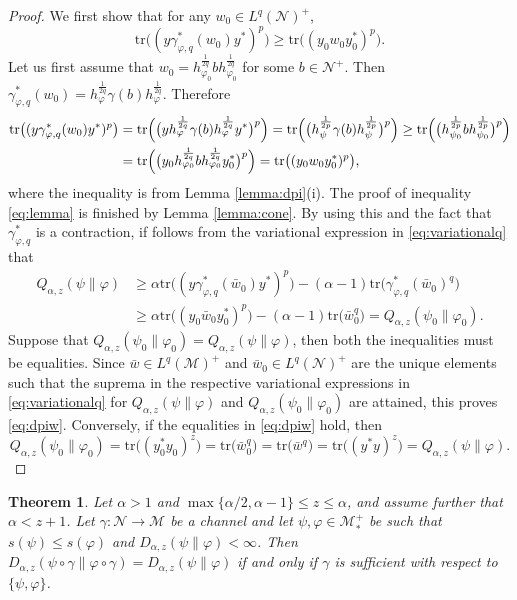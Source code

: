 \documentclass[12pt]{article}
\newtheorem{theorem}{Theorem}[section]
\theoremstyle{definition}
\theoremstyle{remark}
\numberwithin{equation}{section}
\def\Me{\mathcal M}
\def\Ne{\mathcal N}
\def\Tr{\mathrm{tr}}
\def\ffi{\varphi}
\begin{document}
\begin{proof} We first show that  for any $w_0\in L^q(\Ne)^+$,
\begin{equation}\label{eq:lemma}
\Tr\bigl((y\gamma^*_{\ffi,q}(w_0)y^*)^p\bigr)\ge
\Tr\bigl((y_0w_0y_0^*)^p\bigr).
\end{equation}
Let us first assume that
$w_0=h_{\varphi_0}^{\frac1{2q}}bh_{\varphi_0}^{\frac1{2q}}$ for some $b\in \Ne^+$. Then 
$\gamma^*_{\varphi,q}(w_0)=h_{\varphi}^{\frac1{2q}}\gamma(b)h_{\varphi}^{\frac1{2q}}$.
Therefore
\begin{align*}
\Tr\bigl((y\gamma^*_{\varphi,q}(w_0)y^*)^p\bigr)
&=\Tr\Bigl(\bigl(yh_{\varphi}^{\frac1{2q}}\gamma(b)h_{\varphi}^{\frac1{2q}}y^*\bigr)^p\Bigr)=
\Tr\Bigl(\bigl(h_\psi^{\frac1{2p}}\gamma(b)h_\psi^{\frac1{2p}}\bigr)^p\Bigr)\ge
\Tr\Bigl(\bigl(h_{\psi_0}^{\frac1{2p}}bh_{\psi_0}^{\frac1{2p}}\bigr)^p\Bigr)\\
&=\Tr\Bigl(\bigl(y_0h_{\varphi_0}^{\frac1{2q}}bh_{\varphi_0}^{\frac1{2q}}y_0^*\bigr)^p\Bigr)
=\Tr\bigl((y_0w_0y_0^*)^p\bigr),
\end{align*}
where the inequality is from Lemma \ref{lemma:dpi}(i). The proof of inequality
\eqref{eq:lemma} is  finished  by Lemma \ref{lemma:cone}.
By using this and the fact that $\gamma^*_{\ffi,q}$ is a contraction, if follows from the variational
expression in \eqref{eq:variationalq} that
\begin{align*}
Q_{\alpha,z}(\psi\|\varphi)
&\ge \alpha\Tr\bigl((y\gamma^*_{\varphi,q}(\bar w_0)y^*)^p\bigr)-
(\alpha-1)\Tr\bigl(\gamma^*_{\varphi,q}(\bar w_0)^q\bigr)\\
&\ge \alpha\Tr\bigr((y_0\bar w_0 y_0^*)^p\bigr)-(\alpha-1)\Tr\bigl(\bar
w_0^q\bigr)=Q_{\alpha,z}(\psi_0\|\varphi_0).
\end{align*}
Suppose that $Q_{\alpha,z}(\psi_0\|\varphi_0)=Q_{\alpha,z}(\psi\|\varphi)$, then both the
inequalities must be equalities. Since $\bar
w\in L^q(\Me)^+$ and $\bar w_0\in L^q(\Ne)^+$ are the unique elements such that the suprema
in the {respective} variational expressions in \eqref{eq:variationalq} for
$Q_{\alpha,z}(\psi\|\varphi)$ and $Q_{\alpha,z}(\psi_0\|\varphi_0)$ are attained, this proves
\eqref{eq:dpiw}. Conversely, if the equalities in \eqref{eq:dpiw} hold, then
\[
Q_{\alpha,z}(\psi_0\|\ffi_0)=\Tr\bigl((y_0^*y_0)^z\bigr)=\Tr\bigl(\bar w_0^q\bigr)
=\Tr\bigl(\bar w^q\bigr)=\Tr\bigl((y^*y)^z\bigr)=Q_{\alpha,z}(\psi\|\ffi).
\]
\end{proof}


\begin{theorem}\label{thm:suffge1}
{Let $\alpha>1$ and $\max\{\alpha/2,\alpha-1\}\le z\le\alpha$, and assume further that
$\alpha<z+1$.} Let $\gamma:\Ne\to \Me$ be a channel and let $\psi,\varphi\in \Me_*^+$ be such that 
$s(\psi)\le s(\ffi)$ and $D_{\alpha,z}(\psi\|\varphi)<\infty$. Then
$D_{\alpha,z}(\psi\circ\gamma\|\ffi\circ\gamma)=D_{\alpha,z}(\psi\|\varphi)$ if and only if
$\gamma$ is sufficient with respect to $\{\psi,\ffi\}$.
\end{theorem}
\end{document}

